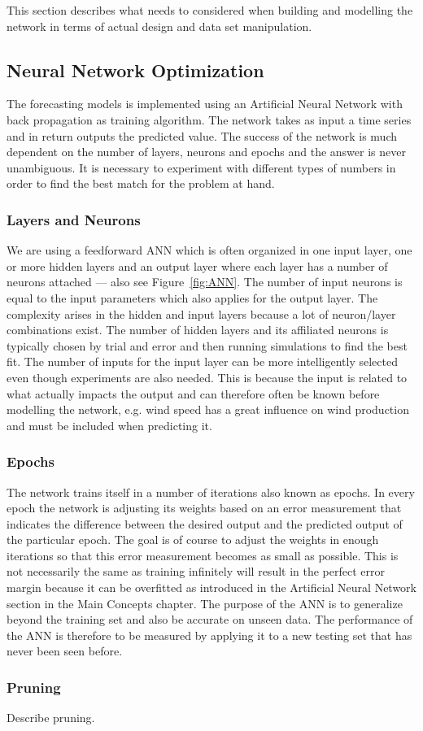 This section describes what needs to considered when building and modelling the network in terms of actual design and data set manipulation.

\subsection{Neural Network Optimization}
The forecasting models is implemented using an Artificial Neural Network with back propagation as training algorithm. The network takes as input a time series and in return outputs the predicted value. The success of the network is much dependent on the number of layers, neurons and epochs and the answer is never unambiguous. It is necessary to experiment with different types of numbers in order to find the best match for the problem at hand.

\subsubsection{Layers and Neurons}
We are using a feedforward ANN which is often organized in one input layer, one or more hidden layers and an output layer where each layer has a number of neurons attached\cite{1} --- also see Figure~\ref{fig:ANN}. The number of input neurons is equal to the input parameters which also applies for the output layer. 
The complexity arises in the hidden and input layers because a lot of neuron/layer combinations exist. The number of hidden layers and its affiliated neurons is typically chosen by trial and error and then running simulations to find the best fit\cite{1}. The number of inputs for the input layer can be more intelligently selected even though experiments are also needed. This is because the input is related to what actually impacts the output and can therefore often be known before modelling the network, e.g. wind speed has a great influence on wind production and must be included when predicting it.

\subsubsection{Epochs}
The network trains itself in a number of iterations also known as epochs. In every epoch the network is adjusting its weights based on an error measurement that indicates the difference between the desired output and the predicted output of the particular epoch\cite{1}. The goal is of course to adjust the weights in enough iterations so that this error measurement becomes as small as possible. This is not necessarily the same as training infinitely will result in the perfect error margin because it can be overfitted as introduced in the Artificial Neural Network section in the Main Concepts chapter. The purpose of the ANN is to generalize beyond the training set and also be accurate on unseen data\cite{1}. The performance of the ANN is therefore to be measured by applying it to a new testing set that has never been seen before.

\subsubsection{Pruning}
Describe pruning.